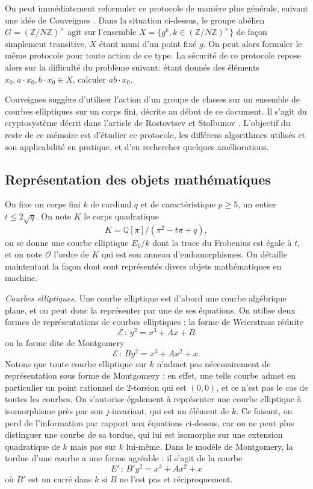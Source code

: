 \documentclass[11pt,a4paper]{article}
\newcommand{\Z}{\mathbb{Z}}
\newcommand{\Q}{\mathbb{Q}}
\newcommand{\E}{\mathcal{E}}
\renewcommand{\O}{\mathcal{O}}
\newcommand{\de}{\,:\,}
\renewcommand{\v}{\vspace{5mm}}
\theoremstyle{definition}
\begin{document}
On peut immédiatement reformuler ce protocole de manière plus générale, suivant une idée de Couveignes \cite{Couv}. Dans la situation ci-dessus, le groupe abélien $G = (\Z/N\Z)^\times$ agit sur l'ensemble $X = \{g^k, k\in (\Z/N\Z)^\times\}$ de façon simplement transitive, $X$ étant muni d'un point fixé $g$. On peut alors formuler le même protocole pour toute action de ce type. La sécurité de ce protocole repose alors sur la difficulté du problème suivant: étant donnés des éléments $x_0, a\cdot x_0, b\cdot x_0\in X$, calculer $ab\cdot x_0$.

Couveignes suggère d'utiliser l'action d'un groupe de classes sur un ensemble de courbes elliptiques sur un corps fini, décrite au début de ce document. Il s'agit du cryptosystème décrit dans l'article de Rostovtsev et Stolbunov \cite{RoSt}. L'objectif du reste de ce mémoire est d'étudier ce protocole, les différens algorithmes utilisés et son applicabilité en pratique, et d'en rechercher quelques améliorations.


\subsection{Représentation des objets mathématiques}

On fixe un corps fini $k$ de cardinal $q$ et de caractéristique $p\geq 5$, un entier $t\leq 2\sqrt{q}$. On note $K$ le corps quadratique
$$K = \Q[\pi] / (\pi^2 - t\pi + q),$$
on se donne une courbe elliptique $E_0/k$ dont la trace du Frobenius est égale à $t$, et on note $\O$ l'ordre de $K$ qui est son anneau d'endomorphismes. On détaille maintentant la façon dont sont représentés divers objets mathématiques \og en machine\fg.

\v

\emph{Courbes elliptiques.} Une courbe elliptique est d'abord une courbe algébrique plane, et on peut donc la représenter par une de ses équations. On utilise deux formes de représentations de courbes elliptiques : la forme de Weierstrass réduite
$$\E\de y^2 = x^3 + Ax + B$$
ou la forme dite de Montgomery
$$\E\de B y^2 = x^3 + A x^2 + x.$$
Notons que toute courbe elliptique sur $k$ n'admet pas nécessairement de représentation sous forme de Montgomery : en effet, une telle courbe admet en particulier un point rationnel de 2-torsion qui est $(0,0)$, et ce n'est pas le cas de toutes les courbes.
On s'autorise également à représenter une courbe elliptique à isomorphisme près par son $j$-invariant, qui est un élément de $k$. Ce faisant, on perd de l'information par rapport aux équations ci-dessus, car on ne peut plus distinguer une courbe de sa tordue, qui lui est isomorphe sur une extension quadratique de $k$ mais pas sur $k$ lui-même. Dans le modèle de Montgomery, la tordue d'une courbe a une forme agréable : il s'agit de la courbe
$$E'\de B'y^2 = x^3 + Ax^2 + x$$
où $B'$ est un carré dans $k$ si $B$ ne l'est pas et réciproquement.
\v
\end{document}
